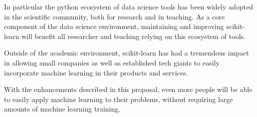 In particular the python ecosystem of data science tools has been widely
adopted in the scientific community, both for research and in teaching.
As a core component of the data science environment, maintaining and
improving scikit-learn will benefit all researcher and teaching relying
on this ecosystem of tools.

Outside of the academic environment, scikit-learn has had a tremendous
impact in allowing small companies as well as established tech giants
to easily incorporate machine learning in their products and services.

With the enhancements described in this proposal, even more people
will be able to easily apply machine learning to their problems,
without requiring large amounts of machine learning training.

